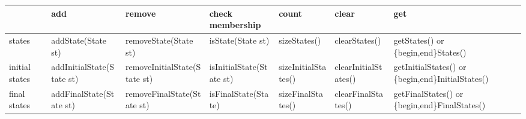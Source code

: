 \begin{sidewaystable}\sffamily\footnotesize
\begin{threeparttable}
\begin{tabular}{p{0.75in}p{1.55in}p{1.6in}p{1.35in}p{1.27in}p{1.2in}p{1.5in}}
\toprule
                 &  add\tnote{1}                            &  remove\tnote{1}                          &  check membership\tnote{3} &  count                &  clear                     &  get\tnote{4}                 \\
\hline\hline %
states           &  addState(State st)                      &  removeState(State st)                    &  isState(State st)         &  sizeStates()         &  clearStates()\tnote{5}    &  getStates() or \newline
                                                                                                                                                                                             \{begin,end\}States()        \\
initial \newline
states           &  addInitialState(State st)               &  removeInitialState(State st)             &  isInitialState(State st)  &  sizeInitialStates()  &  clearInitialStates()      &  getInitialStates() or \newline
                                                                                                                                                                                             \{begin,end\}InitialStates() \\
final
\newline  states &  addFinalState(State st)                 &  removeFinalState(State st)               &  isFinalState(State)       &  sizeFinalStates()    &  clearFinalStates()        &  getFinalStates() or \newline
                                                                                                                                                                                             \{begin,end\}FinalStates()    \\
\hline %

\end{tabular}
\end{threeparttable}
\end{sidewaystable}
